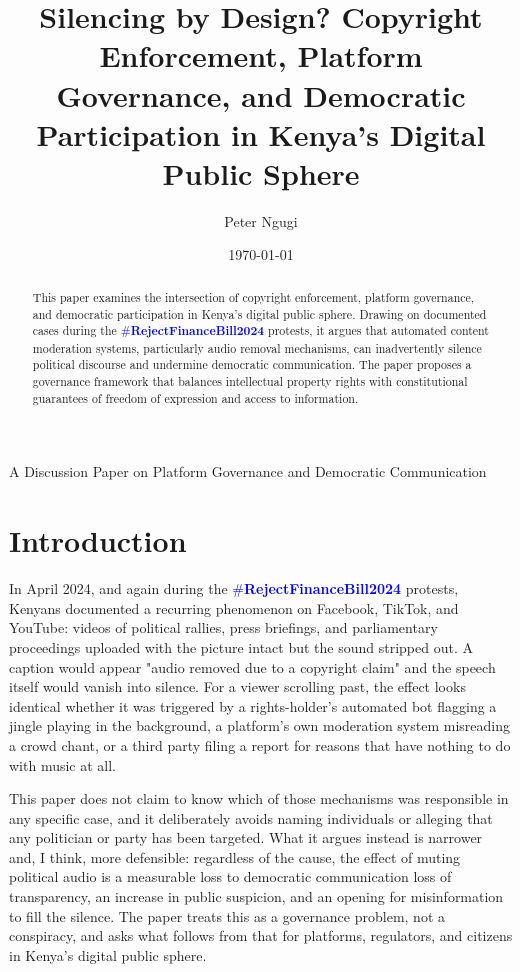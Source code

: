 \documentclass{article}
\title{Silencing by Design? Copyright Enforcement, Platform Governance, and Democratic Participation in Kenya's Digital Public Sphere}
\author{Peter Ngugi}
\date{\today}
\newcommand{\rejectbill}{\textcolor{blue}{\#\textbf{RejectFinanceBill2024}}}
\begin{document}
\maketitle

\begin{center}
\large A Discussion Paper on Platform Governance and Democratic Communication
\end{center}

\vspace{0.5cm}

\begin{abstract}
This paper examines the intersection of copyright enforcement, platform governance, and democratic participation in Kenya's digital public sphere. Drawing on documented cases during the \rejectbill{} protests, it argues that automated content moderation systems, particularly audio removal mechanisms, can inadvertently silence political discourse and undermine democratic communication. The paper proposes a governance framework that balances intellectual property rights with constitutional guarantees of freedom of expression and access to information.
\end{abstract}

\section{Introduction}

In April 2024, and again during the \rejectbill{} protests, Kenyans documented a recurring phenomenon on Facebook, TikTok, and YouTube: videos of political rallies, press briefings, and parliamentary proceedings uploaded with the picture intact but the sound stripped out. A caption would appear "audio removed due to a copyright claim" and the speech itself would vanish into silence. For a viewer scrolling past, the effect looks identical whether it was triggered by a rights-holder's automated bot flagging a jingle playing in the background, a platform's own moderation system misreading a crowd chant, or a third party filing a report for reasons that have nothing to do with music at all.

This paper does not claim to know which of those mechanisms was responsible in any specific case, and it deliberately avoids naming individuals or alleging that any politician or party has been targeted. What it argues instead is narrower and, I think, more defensible: regardless of the cause, the effect of muting political audio is a measurable loss to democratic communication loss of transparency, an increase in public suspicion, and an opening for misinformation to fill the silence. The paper treats this as a governance problem, not a conspiracy, and asks what follows from that for platforms, regulators, and citizens in Kenya's digital public sphere.
\end{document}
